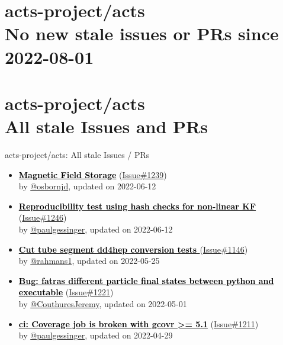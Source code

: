\section{ acts-project/acts \\ No new stale issues or PRs since 2022-08-01 }



\section{ acts-project/acts \\ All stale Issues and PRs}
\begin{frame}[allowframebreaks]{ acts-project/acts: All stale Issues / PRs}
  \begin{itemize}
    
    \item
    \textbf{\href{https://github.com/acts-project/acts/issues/1239}{\textcolor{black}{Magnetic Field Storage}}}
    (\href{https://github.com/acts-project/acts/issues/1239}{Issue\#1239}) \\
    by \href{https://github.com/osbornjd}{ @osbornjd}, updated on 2022-06-12

    \item
    \textbf{\href{https://github.com/acts-project/acts/issues/1246}{\textcolor{black}{Reproducibility test using hash checks for non-linear KF}}}
    (\href{https://github.com/acts-project/acts/issues/1246}{Issue\#1246}) \\
    by \href{https://github.com/paulgessinger}{ @paulgessinger}, updated on 2022-06-12

    \item
    \textbf{\href{https://github.com/acts-project/acts/issues/1146}{\textcolor{black}{Cut tube segment dd4hep conversion tests }}}
    (\href{https://github.com/acts-project/acts/issues/1146}{Issue\#1146}) \\
    by \href{https://github.com/rahmans1}{ @rahmans1}, updated on 2022-05-25

    \item
    \textbf{\href{https://github.com/acts-project/acts/issues/1221}{\textcolor{black}{Bug: fatras different particle final states between python and executable}}}
    (\href{https://github.com/acts-project/acts/issues/1221}{Issue\#1221}) \\
    by \href{https://github.com/CouthuresJeremy}{ @CouthuresJeremy}, updated on 2022-05-01

    \item
    \textbf{\href{https://github.com/acts-project/acts/issues/1211}{\textcolor{black}{ci: Coverage job is broken with gcovr >= 5.1}}}
    (\href{https://github.com/acts-project/acts/issues/1211}{Issue\#1211}) \\
    by \href{https://github.com/paulgessinger}{ @paulgessinger}, updated on 2022-04-29


\end{itemize}
\end{frame}

